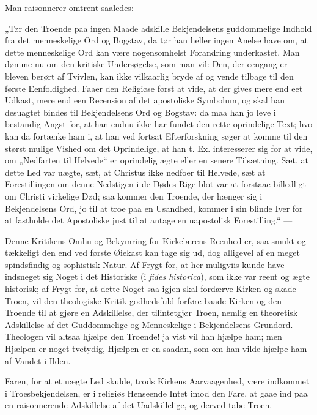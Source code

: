 \documentclass[12pt,a4paper]{book}
\newcommand{\opage}[1]{\marginnote{\footnotesize\textit{[#1]}}}
\begin{document}
Man raisonnerer omtrent saaledes:

„Tør den Troende paa ingen Maade adskille Bekjendelsens
guddommelige Indhold fra det menneskelige Ord og Bogstav, da tør
han heller ingen Anelse have om, at dette menneskelige Ord kan være
nogensomhelst Forandring underkastet. Man dømme nu om den kritiske
Undersøgelse, som man vil: Den, der eengang er bleven berørt af
Tvivlen, kan ikke vilkaarlig bryde af og vende tilbage til den
første Eenfoldighed. Faaer den Religiøse først at vide, at der
gives mere end eet Udkast, mere end een Recension af det apostoliske
Symbolum, og skal han desuagtet bindes til Bekjendelsens Ord og
Bogstav: da maa han jo leve i bestandig Angst for, at han endnu ikke
har fundet den rette oprindelige Text; hvo kan da fortænke ham i, at
han ved fortsat Efterforskning søger at komme til den størst mulige
Vished om det Oprindelige, at han t. Ex. interesserer sig for at
vide, om „Nedfarten til Helvede“ er oprindelig ægte eller en senere
Tilsætning. Sæt, at dette Led var uægte, sæt, at Christus ikke
nedfoer til Helvede, sæt at Forestillingen om denne Nedstigen i de
Dødes Rige blot var at forstaae billedligt om Christi virkelige Død;
saa kommer den Troende, der hænger sig i Bekjendelsens Ord, jo til
at troe paa en Usandhed, kommer i sin blinde Iver for at fastholde
det Apostoliske just til at antage en uapostolisk Forestilling.“ ---

Denne Kritikens Omhu og Bekymring for Kirkelærens Reenhed er, saa
smukt og tækkeligt den end ved første Øiekast kan tage sig ud, dog
alligevel af en meget spindsfindig og sophistisk Natur. Af Frygt for,
at her muligviis kunde have indsneget sig
\opage{28} Noget i det Historiske (i \textit{fides historica}), som ikke var
reent og ægte historisk; af Frygt for, at dette Noget saa igjen skal
fordærve Kirken og skade Troen, vil den theologiske Kritik
godhedsfuld forføre baade Kirken og den Troende til at gjøre en
Adskillelse, der tilintetgjør Troen, nemlig en theoretisk
Adskillelse af det Guddommelige og Menneskelige i Bekjendelsens
Grundord. Theologen vil altsaa hjælpe den Troende! ja vist vil han
hjælpe ham; men Hjælpen er noget tvetydig, Hjælpen er en saadan, som
om han vilde hjælpe ham af Vandet i Ilden.

Faren, for at et uægte Led skulde, trods Kirkens Aarvaagenhed, være
indkommet i Troesbekjendelsen, er i religiøs Henseende Intet imod
den Fare, at gaae ind paa en raisonnerende Adskillelse af det
Uadskillelige, og derved tabe Troen.
\end{document}

